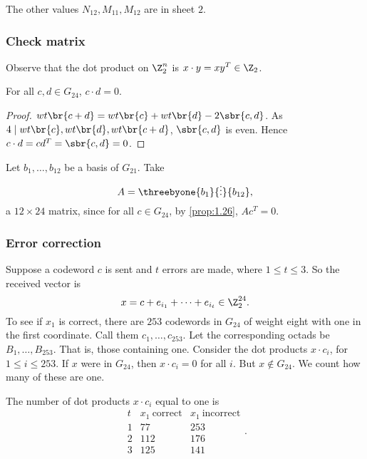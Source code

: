 The other values $ N_{12}, M_{11}, M_{12} $ are in sheet $ 2 $.

\pagebreak

\subsubsection{Check matrix}

Observe that the dot product on $ \Z_2^n $ is $ x \cdot y = xy^T \in \Z_2 $.

\begin{proposition}
\label{prop:1.26}
For all $ c, d \in G_{24} $, $ c \cdot d = 0 $.
\end{proposition}

\begin{proof}
$ wt\br{c + d} = wt\br{c} + wt\br{d} - 2\sbr{c, d} $. As $ 4 \mid wt\br{c}, wt\br{d}, wt\br{c + d} $, $ \sbr{c, d} $ is even. Hence $ c \cdot d = cd^T = \sbr{c, d} = 0 $.
\end{proof}

Let $ b_1, \dots, b_{12} $ be a basis of $ G_{21} $. Take
$$ A = \threebyone{b_1}{\vdots}{b_{12}}, $$
a $ 12 \times 24 $ matrix, since for all $ c \in G_{24} $, by \ref{prop:1.26}, $ Ac^T = 0 $.

\subsubsection{Error correction}

Suppose a codeword $ c $ is sent and $ t $ errors are made, where $ 1 \le t \le 3 $. So the received vector is
$$ x = c + e_{i_1} + \dots + e_{i_t} \in \Z_2^{24}. $$
To see if $ x_1 $ is correct, there are $ 253 $ codewords in $ G_{24} $ of weight eight with one in the first coordinate. Call them $ c_1, \dots, c_{253} $. Let the corresponding octads be $ B_1, \dots, B_{253} $. That is, those containing one. Consider the dot products $ x \cdot c_i $, for $ 1 \le i \le 253 $. If $ x $ were in $ G_{24} $, then $ x \cdot c_i = 0 $ for all $ i $. But $ x \notin G_{24} $. We count how many of these are one.

\begin{proposition}
The number of dot products $ x \cdot c_i $ equal to one is
$$
\begin{array}{c|cc}
t & x_1 \ \text{correct} & x_1 \ \text{incorrect} \\
\hline
1 & 77 & 253 \\
2 & 112 & 176 \\
3 & 125 & 141
\end{array}.
$$
\end{proposition}

